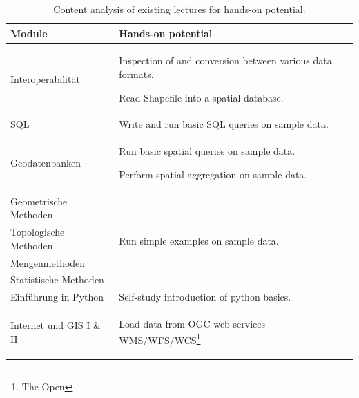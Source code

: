 \documentclass[11pt, a4paper, oneside, parskip=full-]{scrartcl}
\begin{document}
\begin{table}[!htbp]
  \centering
  \caption{Content analysis of existing lectures for hands-on potential.}
  \label{tab:tContentAnalysis}
  \begin{tabularx}{\textwidth}{lX}
    \toprule
    \textbf{Module} & \textbf{Hands-on potential} \\
    \midrule
    Interoperabilität &
      \begin{itemize}[left=0pt,nosep,before={\begin{minipage}[t]{\hsize}},after
      ={\end{minipage}}]
      \item Inspection of and conversion between various data formats.
      \item Read Shapefile into a spatial database.
      \end{itemize}\nointerlineskip\\
    \midrule
    SQL & Write and run basic SQL queries on sample data. \\
    \midrule
    Geodatenbanken &
    \begin{itemize}[left=0pt,nosep,before={\begin{minipage}[t]{\hsize}},after
    ={\end{minipage}}]
      \item Run basic spatial queries on sample data.
      \item Perform spatial aggregation on sample data.
      \end{itemize}\nointerlineskip\\
    \midrule
    Geometrische Methoden & \multirow[t]{4}{*}{Run simple examples on sample
    data.} \\
    \cmidrule(r){1-1} Topologische Methoden &  \\
    \cmidrule(r){1-1} Mengenmethoden &  \\
    \cmidrule(r){1-1} Statistische Methoden &  \\
    \midrule
    Einführung in Python & Self-study introduction of python basics. \\
    \midrule
    Internet und GIS I \& II &
      \begin{itemize}[left=0pt,nosep,before={\begin{minipage}[t]{\hsize}},after
      ={\end{minipage}}]
      \item Load data from OGC web services WMS/WFS/WCS\footnote{The Open
}
\end{itemize}
\end{tabularx}
\end{table}
\end{document}
